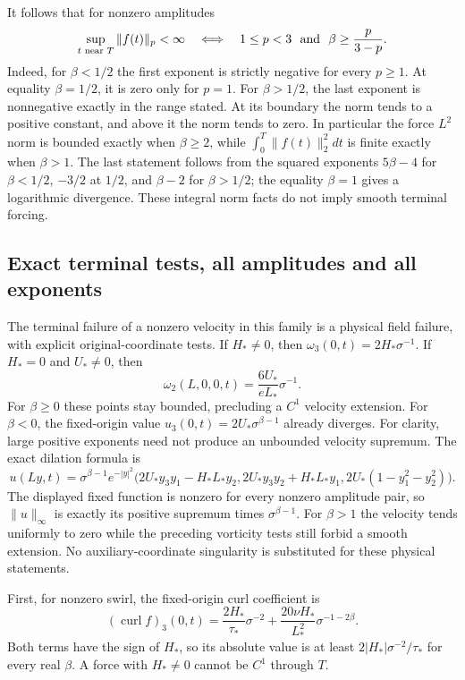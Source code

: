 It follows that for nonzero amplitudes
\begin{equation}\label{eq:ag-Lp-classification}
 \sup_{t\text{ near }T}\|f(t)\|_p<\infty
 \quad\Longleftrightarrow\quad
 1\leq p<3\ \hbox{ and }\ \beta\geq\frac{p}{3-p}.
\end{equation}
Indeed, for \(\beta<1/2\) the first exponent is strictly negative
for every \(p\geq1\).  At equality \(\beta=1/2\), it is zero only
for \(p=1\).  For \(\beta>1/2\), the last exponent is nonnegative
exactly in the range stated.  At its boundary the norm tends to a
positive constant, and above it the norm tends to zero.
In particular the force \(L^2\) norm is bounded exactly when
\(\beta\geq2\), while \(\int_0^T\|f(t)\|_2^2dt\) is finite
exactly when \(\beta>1\).  The last statement follows from the squared
exponents \(5\beta-4\) for \(\beta<1/2\), \(-3/2\) at \(1/2\),
and \(\beta-2\) for \(\beta>1/2\); the equality \(\beta=1\)
gives a logarithmic divergence.  These integral norm facts do not imply
smooth terminal forcing.

\subsection{Exact terminal tests, all amplitudes and all exponents}

The terminal failure of a nonzero velocity in this family is a physical
field failure, with explicit original-coordinate tests.  If \(H_*\ne0\),
then \(\omega_3(0,t)=2H_*\sigma^{-1}\).  If \(H_*=0\) and
\(U_*\ne0\), then
\[
 \omega_2(L,0,0,t)=\frac{6U_*}{eL_*}\sigma^{-1}.
\]
For \(\beta\geq0\) these points stay bounded, precluding a \(C^1\)
velocity extension.  For \(\beta<0\), the fixed-origin value
\(u_3(0,t)=2U_*\sigma^{\beta-1}\) already diverges.
For clarity, large positive exponents need not produce an unbounded
velocity supremum.  The exact dilation formula is
\[
 u(Ly,t)=\sigma^{\beta-1}e^{-|y|^2}
 \bigl(2U_*y_3y_1-H_*L_*y_2,
       2U_*y_3y_2+H_*L_*y_1,
       2U_*(1-y_1^2-y_2^2)\bigr).
\]
The displayed fixed function is nonzero for every nonzero amplitude
pair, so \(\|u\|_\infty\) is exactly its positive supremum times
\(\sigma^{\beta-1}\).  For \(\beta>1\) the velocity tends uniformly
to zero while the preceding vorticity tests still forbid a smooth
extension.  No auxiliary-coordinate singularity is substituted for
these physical statements.

First, for nonzero swirl, the fixed-origin curl coefficient is
\begin{equation}\label{eq:ag-swirl-origin}
 (\operatorname{curl}f)_3(0,t)
 =\frac{2H_*}{\tau_*}\sigma^{-2}
       +\frac{20\nu H_*}{L_*^2}\sigma^{-1-2\beta}.
\end{equation}
Both terms have the sign of \(H_*\), so its absolute value is at least
\(2|H_*|\sigma^{-2}/\tau_*\) for every real \(\beta\).  A force
with \(H_*\ne0\) cannot be \(C^1\) through \(T\).

